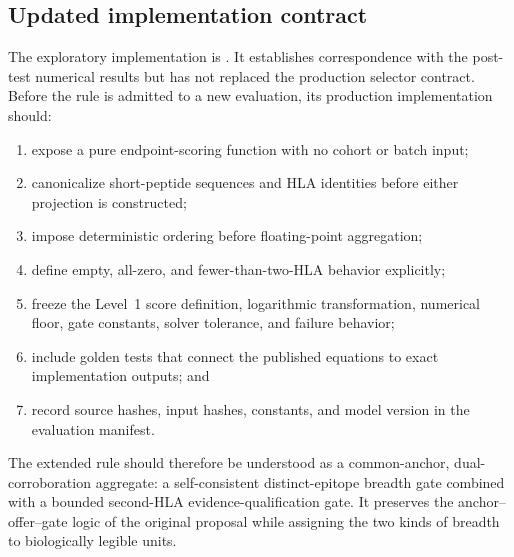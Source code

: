 \documentclass[11pt]{article}
\begin{document}
\subsection{Updated implementation contract}

The exploratory implementation is
.
It establishes correspondence with the post-test numerical results but has not
replaced the production selector contract. Before the rule is admitted to a
new evaluation, its production implementation should:
\begin{enumerate}
  \item expose a pure endpoint-scoring function with no cohort or batch input;
  \item canonicalize short-peptide sequences and HLA identities before either
  projection is constructed;
  \item impose deterministic ordering before floating-point aggregation;
  \item define empty, all-zero, and fewer-than-two-HLA behavior explicitly;
  \item freeze the Level~1 score definition, logarithmic transformation,
  numerical floor, gate constants, solver tolerance, and failure behavior;
  \item include golden tests that connect the published equations to exact
  implementation outputs; and
  \item record source hashes, input hashes, constants, and model version in
  the evaluation manifest.
\end{enumerate}

The extended rule should therefore be understood as a common-anchor,
dual-corroboration aggregate: a self-consistent distinct-epitope breadth gate
combined with a bounded second-HLA evidence-qualification gate. It preserves
the anchor--offer--gate logic of the original proposal while assigning the two
kinds of breadth to biologically legible units.
\end{document}
